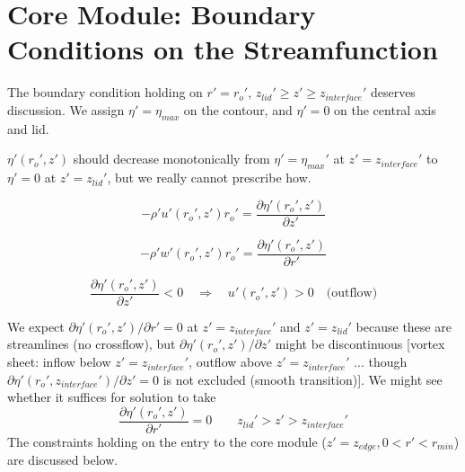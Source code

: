 \documentclass[preprint, prX]{revtex4}
\newcommand{\pd}[2]{\frac{\partial#1}{\partial#2}}
\newcommand{\vpd}[2]{\partial#1 / \partial#2}
\newcommand{\rmin}{r_{min}}
\newcommand{\zedge}{z_{edge}}
\newcommand{\zinter}{z_{interface}}
\begin{document}
\section{Core Module: Boundary Conditions on the Streamfunction}

\begin{figure}[h!]
	\centering
	\def\svgwidth{0.7\columnwidth}
	
\end{figure}

The boundary condition holding on $r'=r_o'$, $z_{lid}'\geq z' \geq \zinter'$ deserves discussion. We assign $\eta'=\eta_{max}$ on the contour, and $\eta'=0$ on the central axis and lid.

$\eta'(r_o',z')$ should decrease monotonically from $\eta' = \eta_{max}'$ at $z'=\zinter'$ to $\eta'=0$ at $z'=z_{lid}'$, but we really cannot prescribe how.

\begin{equation}
-\rho' u'(r_o',z')r_o' = \pd{\eta'(r_o',z')}{z'}
\end{equation}

\begin{equation}
-\rho' w'(r_o',z')r_o' = \pd{\eta'(r_o',z')}{r'}
\end{equation}


\begin{equation}
\pd{\eta'(r_o',z')}{z'} <0 \quad \Rightarrow \quad u'(r_o',z') > 0 \quad \text{(outflow)}
\end{equation}

We expect $\vpd{\eta'(r_o',z')}{r'} =0$ at $z'=\zinter'$ and $z'=z_{lid}'$ because these are streamlines (no crossflow), but $\vpd{\eta'(r_o',z')}{z'}$ might be discontinuous [vortex sheet: inflow below $z'=\zinter'$, outflow above $z'=\zinter'$ ... though $\vpd{\eta'(r_o',\zinter')}{z'} = 0$ is not excluded (smooth transition)]. We might see whether it suffices for solution to take
\begin{equation}
\pd{\eta'(r_o',z')}{r'} = 0 \qquad z_{lid}'> z'> \zinter'
\end{equation}
The constraints holding on the entry to the core module ($z'=\zedge, 0 < r' < \rmin$) are discussed below.
\end{document}
